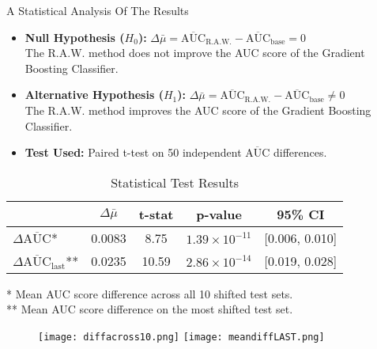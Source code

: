 \begin{frame}{A Statistical Analysis Of The Results}
    \begin{itemize}
        \item \textbf{Null Hypothesis ($H_0$):} $\Delta\bar{\mu} = \overline{\text{AUC}}_{\text{R.A.W.}} - \overline{\text{AUC}}_{\text{base}} = 0$ \\
        \quad The R.A.W. method does not improve the AUC score of the Gradient Boosting Classifier.
        
        \item \textbf{Alternative Hypothesis ($H_1$):} $\Delta\bar{\mu} = \overline{\text{AUC}}_{\text{R.A.W.}} - \overline{\text{AUC}}_{\text{base}} \neq 0$ \\
        \quad The R.A.W. method improves the AUC score of the Gradient Boosting Classifier.
        
        \item \textbf{Test Used:} Paired t-test on 50 independent $\overline{\text{AUC}}$ differences.
    \end{itemize}
    
    \vspace{1em}
    
    \begin{table}[h!]
        \centering
        \small
        \begin{tabular}{lcccc}
            \toprule
            & $\Delta\bar{\mu}$ & t-stat & p-value & 95\% CI \\
            \midrule
            $\Delta\overline{\text{AUC}}$* & 0.0083 & 8.75  & $1.39 \times 10^{-11}$ & [0.006, 0.010] \\
            $\Delta\overline{\text{AUC}}_{\text{last}}$** & 0.0235 & 10.59 & $2.86 \times 10^{-14}$ & [0.019, 0.028] \\
            \bottomrule
        \end{tabular}
        \caption{Statistical Test Results}
        \label{tab:stat_results}
    \end{table}
    
    \vspace{0.5em}
    
    \begin{footnotesize}
        * Mean AUC score difference across all 10 shifted test sets. \\
        ** Mean AUC score difference on the most shifted test set.
    \end{footnotesize}
   
\end{frame}


\begin{frame}
    \begin{figure}
        \centering
        \texttt{[image: diffacross10.png]}
        \hfill
        \texttt{[image: meandiffLAST.png]}
    \end{figure}
\end{frame}

